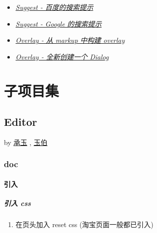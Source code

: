 \documentclass[letterpaper,10pt,english]{sphinxmanual}
\begin{document}
\begin{itemize}
\item {}
{\hyperref[demo/component/suggest/index:component-suggest-demo3]{\emph{Suggest - 百度的搜索提示}}}

\item {}
{\hyperref[demo/component/suggest/index:component-suggest-demo4]{\emph{Suggest - Google 的搜索提示}}}

\item {}
{\hyperref[demo/component/overlay/index:component-overlay-demo1]{\emph{Overlay - 从 markup 中构建 overlay}}}

\item {}
{\hyperref[demo/component/overlay/index:component-overlay-demo2]{\emph{Overlay - 全新创建一个 Dialog}}}

\end{itemize}


\chapter{子项目集}
\label{relatedproj/index:relatedproj}\label{relatedproj/index::doc}\label{relatedproj/index:id1}\label{relatedproj/editorguide/index:module-Editor}

\section{Editor}
\label{relatedproj/editorguide/index::doc}\label{relatedproj/editorguide/index:editor}
by \href{mailto:yiminghe@gmail.com}{承玉} , \href{mailto:lifesinger@gmail.com}{玉伯}


\subsection{doc}
\label{relatedproj/editorguide/index:doc}

\subsubsection{引入}
\label{relatedproj/editorguide/install::doc}\label{relatedproj/editorguide/install:id1}

\paragraph{引入 css}
\label{relatedproj/editorguide/install:css}\begin{enumerate}
\item {}
在页头加入 reset css (淘宝页面一般都已引入)

\end{enumerate}
\end{document}
